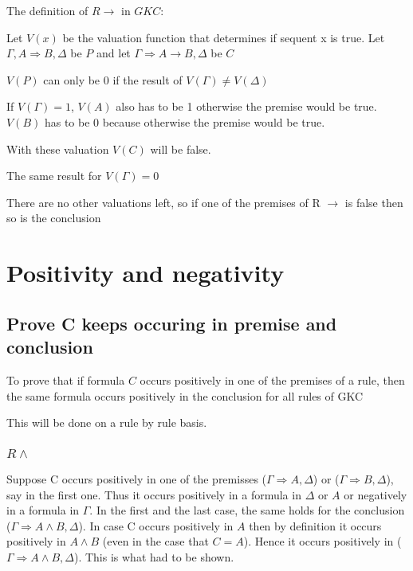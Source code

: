 \documentclass{article}
\newenvironment{scprooftree}[1]%
{\gdef\scalefactor{#1}\begin{center}\proofSkipAmount \leavevmode}%
{\scalebox{\scalefactor}{\DisplayProof}\proofSkipAmount \end{center} }
\begin{document}
The definition of $R\to$ in $GKC$:

\begin{scprooftree}{1}
\end{scprooftree}
Let $V(x)$ be the valuation function that determines if sequent x
is true.
Let $\Gamma, A \Rightarrow B, \Delta$ be $P$ and
let $\Gamma \Rightarrow A \to B, \Delta$ be $C$


$V(P)$ can only be 0 if the result of
$V(\Gamma) \not= V(\Delta)$

If $V(\Gamma) = 1$, $V(A)$ also has to be 1 otherwise the premise would be true.
$V(B)$ has to be 0 because otherwise the premise would be true.

With these valuation $V(C)$ will be false.

The same result for $V(\Gamma) = 0$

There are no other valuations left, so if one of the premises of R $\to$ is
false then so is the conclusion


\section{Positivity and negativity}
\subsection{Prove C keeps occuring in premise and conclusion}
To prove that if formula $C$ occurs positively in one of the premises of a rule,
then the same formula occurs positively in the conclusion for all rules of GKC

This will be done on a rule by rule basis.

\subsubsection{$R\wedge$}
Suppose C occurs positively in one of the premisses
($\Gamma \Rightarrow A, \Delta$) or ($\Gamma \Rightarrow B,\Delta$),
say in the first one. Thus it occurs positively in a formula in $\Delta$ or
$A$ or negatively in a formula in $\Gamma$. In the first and the last case,
the same holds for the conclusion ($\Gamma \Rightarrow A \wedge B, \Delta$).
In case C occurs positively in $A$ then by definition it occurs positively
in $A \wedge B$ (even in the case that $C = A$). Hence it occurs positively
in ($\Gamma \Rightarrow A \wedge B, \Delta$). This is what had to be shown.
\end{document}
